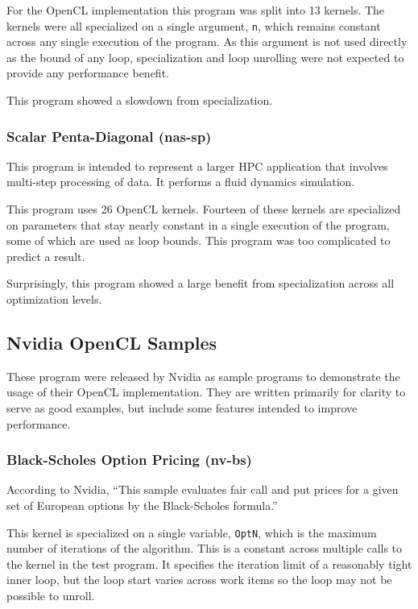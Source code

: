 \documentclass{acm_proc_article-sp}
\begin{document}
For the OpenCL implementation this program was split into 13 kernels. The
kernels were all specialized on a single argument, {\tt n}, which remains
constant across any single execution of the program. As this argument is not
used directly as the bound of any loop, specialization and loop unrolling were
not expected to provide any performance benefit.

This program showed a slowdown from specialization.

\subsubsection{Scalar Penta-Diagonal (nas-sp)}

This program is intended to represent a larger HPC application that involves
multi-step processing of data. It performs a fluid dynamics simulation.

This program uses 26 OpenCL kernels. Fourteen of these kernels are specialized
on parameters that stay nearly constant in a single execution of the program,
some of which are used as loop bounds. This program was too complicated to
predict a result.

Surprisingly, this program showed a large benefit from specialization across
all optimization levels.

\subsection{Nvidia OpenCL Samples}

These program were released by Nvidia as sample programs to demonstrate the
usage of their OpenCL implementation. They are written primarily for clarity to
serve as good examples, but include some features intended to improve
performance.

\subsubsection{Black-Scholes Option Pricing (nv-bs)}

According to Nvidia, ``This sample evaluates fair call and put prices for a
given set of European options by the Black-Scholes formula.'' 

This kernel is specialized on a single variable, {\tt OptN}, which is the maximum
number of iterations of the algorithm. This is a constant across multiple calls
to the kernel in the test program. It specifies the iteration limit of a
reasonably tight inner loop, but the loop start varies across work items so the
loop may not be possible to unroll.
\end{document}
